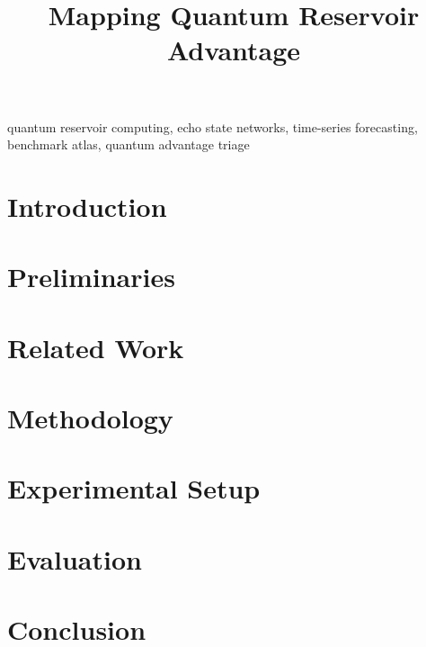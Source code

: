 \documentclass[conference,a4paper]{IEEEtran}
\begin{document}
\title{Mapping Quantum Reservoir Advantage}

\author{%
}
\maketitle
\thispagestyle{empty}
\pagestyle{empty}

\begin{abstract}

\end{abstract}

\begin{IEEEkeywords}
quantum reservoir computing, echo state networks, time-series forecasting, benchmark atlas, quantum advantage triage
\end{IEEEkeywords}

\section{Introduction}
\label{sec:introduction}


\section{Preliminaries}
\label{sec:background}


\section{Related Work}
\label{sec:relatedwork}


\section{Methodology}
\label{sec:methodology}


\section{Experimental Setup}
\label{sec:experimental}


\section{Evaluation}
\label{sec:evaluation}


\section{Conclusion}
\label{sec:conclusion}

\end{document}
